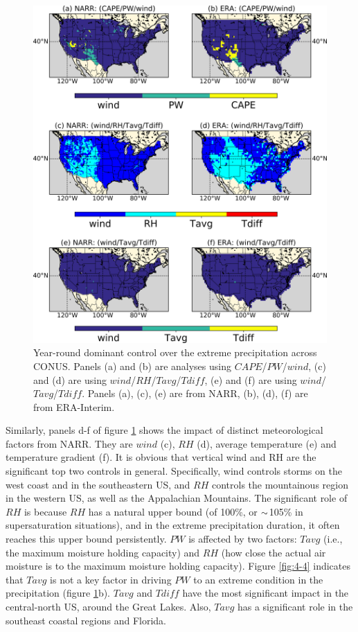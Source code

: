 \begin{figure}[htbp]
	\includegraphics[width=\linewidth]{pics/ch4/fig5.png}
	\caption{Year-round dominant control over the extreme precipitation across CONUS. Panels (a) and (b) are analyses using $CAPE$/$PW$/$wind$, (c) and (d) are using $wind$/$RH$/$Tavg$/$Tdiff$, (e) and (f) are using $wind$/$Tavg$/$Tdiff$. Panels (a), (c), (e) are from NARR, (b), (d), (f) are from ERA-Interim.}
	\label{fig:4-5}
\end{figure}

Similarly, panels d-f of figure \ref{fig:4-5} shows the impact of distinct meteorological factors from NARR. They are $wind$ (c), $RH$ (d), average temperature (e) and temperature gradient (f). It is obvious that vertical wind and RH are the significant top two controls in general. Specifically, wind controls storms on the west coast and in the southeastern US, and $RH$ controls the mountainous region in the western US, as well as the Appalachian Mountains. The significant role of $RH$ is because $RH$ has a natural upper bound (of 100\%, or $\scriptsize{\sim}$105\% in supersaturation situations), and in the extreme precipitation duration, it often reaches this upper bound persistently. $PW$ is affected by two factors: $Tavg$ (i.e., the maximum moisture holding capacity) and $RH$ (how close the actual air moisture is to the maximum moisture holding capacity). Figure \ref{fig:4-4} indicates that $Tavg$ is not a key factor in driving $PW$ to an extreme condition in the precipitation (figure \ref{fig:4-5}b). $Tavg$ and $Tdiff$ have the most significant impact in the central-north US, around the Great Lakes. Also, $Tavg$ has a significant role in the southeast coastal regions and Florida.

